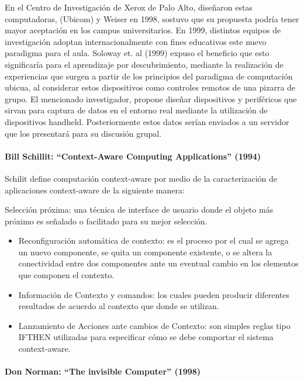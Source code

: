 En el Centro de Investigación de Xerox de Palo Alto, diseñaron estas
computadoras,
(Ubicom) y Weiser en 1998, sostuvo que su propuesta podría tener mayor
aceptación
en los campus universitarios. En 1999, distintos equipos de investigación
adoptan
internacionalmente con fines educativos este nuevo paradigma para el aula.
Soloway et.
al (1999) expuso el beneficio que esto significaría para el aprendizaje por
descubrimiento, mediante la realización de experiencias que surgen a partir de
los
principios del paradigma de computación ubicua, al considerar estos dispositivos
como
controles remotos de una pizarra de grupo. El mencionado investigador, propone
diseñar dispositivos y periféricos que sirvan para captura de datos en el
entorno real
mediante la utilización de dispositivos handheld. Posteriormente estos datos
serían
enviados a un servidor que los presentará para su discusión grupal.


\paragraph {Bill Schillit: “Context-Aware Computing Applications” (1994)}
  
Schilit define computación context-aware por medio de la caracterización de
aplicaciones context-aware de la siguiente manera:

Selección próxima: una técnica de interface de usuario donde el objeto más
próximo
es señalado o facilitado para su mejor selección.

\begin{itemize}
 \item Reconfiguración automática de contexto: es el proceso por el cual se
agrega un
nuevo componente, se quita un componente existente, o se altera la conectividad
entre dos componentes ante un eventual cambio en los elementos que componen el
contexto.

\item
Información de Contexto y comandos: los cuales pueden producir diferentes
resultados de acuerdo al contexto que donde se utilizan.


\item Lanzamiento de Acciones ante cambios de Contexto: son simples reglas tipo
IFTHEN
utilizadas para especificar cómo se debe comportar el sistema context-aware.

\end{itemize}



\paragraph {Don Norman: “The invisible Computer” (1998)}

